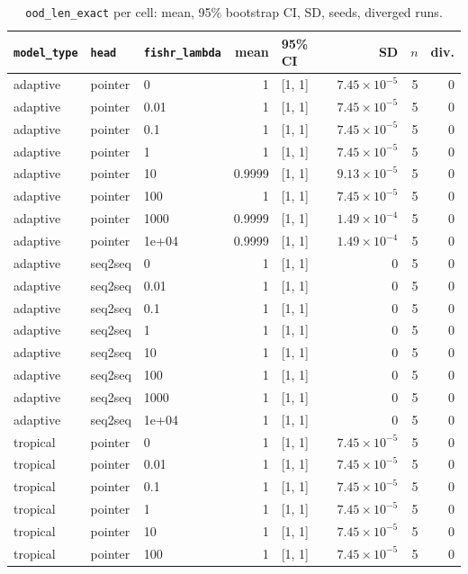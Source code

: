 \documentclass[10pt]{article}
\begin{document}
{\small
\begin{longtable}{lllrlrrr}
\caption{\texttt{ood\_len\_exact} per cell: mean, 95\% bootstrap CI, SD, seeds, diverged runs.}\label{tab:summary-ood_len_exact}\\
\toprule
\texttt{model\_type} & \texttt{head} & \texttt{fishr\_lambda} & mean & 95\% CI & SD & $n$ & div.\\
\midrule
\endhead
adaptive & pointer & 0 & 1 & [1, 1] & $7.45\times10^{-5}$ & 5 & 0\\
adaptive & pointer & 0.01 & 1 & [1, 1] & $7.45\times10^{-5}$ & 5 & 0\\
adaptive & pointer & 0.1 & 1 & [1, 1] & $7.45\times10^{-5}$ & 5 & 0\\
adaptive & pointer & 1 & 1 & [1, 1] & $7.45\times10^{-5}$ & 5 & 0\\
adaptive & pointer & 10 & 0.9999 & [1, 1] & $9.13\times10^{-5}$ & 5 & 0\\
adaptive & pointer & 100 & 1 & [1, 1] & $7.45\times10^{-5}$ & 5 & 0\\
adaptive & pointer & 1000 & 0.9999 & [1, 1] & $1.49\times10^{-4}$ & 5 & 0\\
adaptive & pointer & 1e+04 & 0.9999 & [1, 1] & $1.49\times10^{-4}$ & 5 & 0\\
adaptive & seq2seq & 0 & 1 & [1, 1] & 0 & 5 & 0\\
adaptive & seq2seq & 0.01 & 1 & [1, 1] & 0 & 5 & 0\\
adaptive & seq2seq & 0.1 & 1 & [1, 1] & 0 & 5 & 0\\
adaptive & seq2seq & 1 & 1 & [1, 1] & 0 & 5 & 0\\
adaptive & seq2seq & 10 & 1 & [1, 1] & 0 & 5 & 0\\
adaptive & seq2seq & 100 & 1 & [1, 1] & 0 & 5 & 0\\
adaptive & seq2seq & 1000 & 1 & [1, 1] & 0 & 5 & 0\\
adaptive & seq2seq & 1e+04 & 1 & [1, 1] & 0 & 5 & 0\\
tropical & pointer & 0 & 1 & [1, 1] & $7.45\times10^{-5}$ & 5 & 0\\
tropical & pointer & 0.01 & 1 & [1, 1] & $7.45\times10^{-5}$ & 5 & 0\\
tropical & pointer & 0.1 & 1 & [1, 1] & $7.45\times10^{-5}$ & 5 & 0\\
tropical & pointer & 1 & 1 & [1, 1] & $7.45\times10^{-5}$ & 5 & 0\\
tropical & pointer & 10 & 1 & [1, 1] & $7.45\times10^{-5}$ & 5 & 0\\
tropical & pointer & 100 & 1 & [1, 1] & $7.45\times10^{-5}$ & 5 & 0\\

\end{longtable}}
\end{document}
